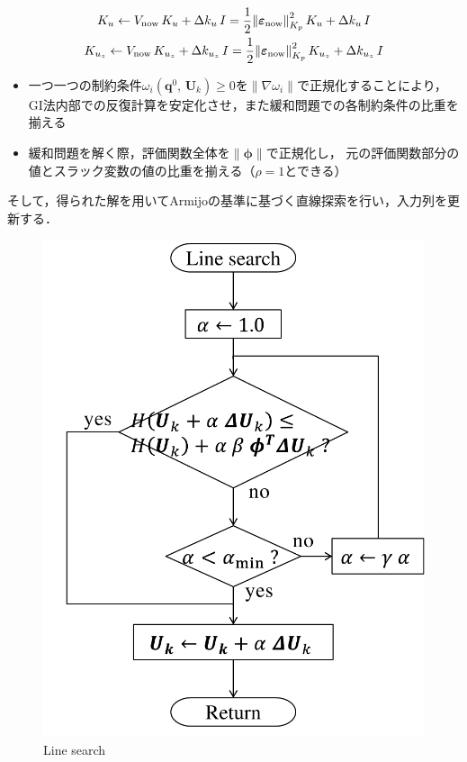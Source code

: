 \documentclass[autodetect-engine,dvipdfmx-if-dvi,ja=standard,a4j,jbase=11pt,magstyle=nomag*]{bxjsreport}
\begin{document}
\begin{equation}
    \label{eq:LM_Kuset_sugihara}
    \begin{gathered}
        K_u \gets V_{\mathrm{now}} \, K_u + \Delta k_u \, I = \frac{1}{2} {\left\| \bm{\varepsilon}_{\mathrm{now}} \right\|}^2_{K_p} \, K_u + \Delta k_u \, I \\
        K_{u_z} \gets V_{\mathrm{now}} \, K_{u_z} + \Delta k_{u_z} \, I = \frac{1}{2} {\left\| \bm{\varepsilon}_{\mathrm{now}} \right\|}^2_{K_p} \, K_{u_z} + \Delta k_{u_z} \, I
    \end{gathered}
\end{equation}
\begin{itemize}
    \item   一つ一つの制約条件$\omega_i(\bm{q}^0 ,\, \bm{U}_k) \geq 0$を$\| \nabla \omega_i \|$で正規化することにより，
            GI法内部での反復計算を安定化させ，また緩和問題での各制約条件の比重を揃える\cite{sugimoto_1985}
    \item   緩和問題を解く際，評価関数全体を$\| \bm{\phi} \|$で正規化し，
            元の評価関数部分の値とスラック変数の値の比重を揃える（$\rho = 1$とできる）
\end{itemize}
そして，得られた解を用いてArmijoの基準に基づく直線探索を行い，入力列を更新する．

\begin{figure}[t]
    \centering
    \includegraphics[width=0.65\linewidth, clip]{./figure/algorithm_linesearch.pdf}
    \caption{Line search}
    \label{fig:algorithm_linesearch}
\end{figure}
\end{document}
